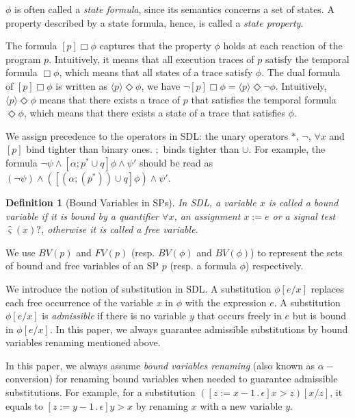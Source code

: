 \documentclass{fcs}
\newtheorem{mydef}{Definition}[section]
\newcommand{\la}[0]{\langle}
\newcommand{\ra}[0]{\rangle}
\newcommand{\sig}[0]{\varsigma}
\newcommand{\BV}[0]{\mathit{BV}}
\newcommand{\FV}[0]{\mathit{FV}} %
\DeclareMathOperator{\seq}{;}
\DeclareMathOperator{\para}{\cap}
\DeclareMathOperator{\nex}{.}
\begin{document}
$\phi$ is often called a \emph{state formula}, since its semantics concerns a set of states.
A property described by a state formula, hence, is called a \emph{state property}.

The formula $[p]\Box\phi$ captures that the property $\phi$ holds at each reaction of the program $p$.
Intuitively, it means that all execution traces of $p$ satisfy the temporal formula $\Box\phi$, which means that
all states of a trace satisfy $\phi$.
The dual formula of $[p]\Box\phi$ is written as $\la p\ra \Diamond\phi$, we have $\neg [p]\Box\phi = \la p\ra\Diamond\neg \phi$.
Intuitively, $\la p\ra \Diamond\phi$ means that there exists a trace of $p$ that satisfies the temporal formula $\Diamond \phi$, which means that there exists a state of a trace that satisfies $\phi$.

We assign precedence to the operators in SDL: the unary operators $*$, $\neg$, $\forall x$ and $[p]$ bind tighter than binary ones.
$\seq$ binds tighter than $\cup$.
For example, the formula $\neg \psi\wedge [\alpha\seq p^*\cup q]\phi\wedge \psi'$ should be read as $(\neg \psi)\wedge ([(\alpha\seq (p^*))\cup q]\phi)\wedge \psi'$.

\begin{mydef}[Bound Variables in SPs]
In SDL, a variable $x$ is called a bound variable if it is bound by a quantifier $\forall x$, an assignment $x := e$ or a signal test $\hat{\sig}(x)?$,
otherwise it is called a free variable.
\end{mydef}

We use $\BV(p)$ and $\FV(p)$ (resp. $\BV(\phi)$ and $\BV(\phi)$) to represent the sets of bound and free variables of an SP $p$ (resp. a formula $\phi$) respectively.

We introduce the notion of substitution in SDL.
A substitution $\phi[e/x]$ replaces each free occurrence of the variable $x$ in $\phi$ with the expression $e$.
A substitution $\phi[e/x]$ is \emph{admissible} if there is no variable $y$ that occurs freely in $e$ but is bound in $\phi[e/x]$.
In this paper, we always guarantee admissible substitutions by bound variables renaming mentioned above.

In this paper, we always assume \emph{bound variables renaming} (also known as $\alpha-$ conversion) for renaming bound variables when needed to guarantee admissible substitutions.
For example, for a substitution $([z:=x-1\nex \epsilon]x > z)[x/z]$, it equals to $[z:=y-1\nex \epsilon]y > x$ by renaming $x$ with a new variable $y$.
\end{document}
